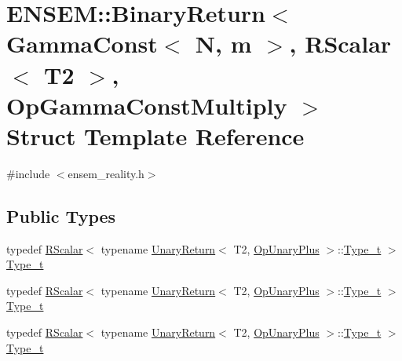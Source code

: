 \hypertarget{structENSEM_1_1BinaryReturn_3_01GammaConst_3_01N_00_01m_01_4_00_01RScalar_3_01T2_01_4_00_01OpGammaConstMultiply_01_4}{}\section{E\+N\+S\+EM\+:\+:Binary\+Return$<$ Gamma\+Const$<$ N, m $>$, R\+Scalar$<$ T2 $>$, Op\+Gamma\+Const\+Multiply $>$ Struct Template Reference}
\label{structENSEM_1_1BinaryReturn_3_01GammaConst_3_01N_00_01m_01_4_00_01RScalar_3_01T2_01_4_00_01OpGammaConstMultiply_01_4}


{\ttfamily \#include $<$ensem\+\_\+reality.\+h$>$}

\subsection*{Public Types}
\begin{DoxyCompactItemize}
\item 
typedef \mbox{\hyperlink{classENSEM_1_1RScalar}{R\+Scalar}}$<$ typename \mbox{\hyperlink{structENSEM_1_1UnaryReturn}{Unary\+Return}}$<$ T2, \mbox{\hyperlink{structENSEM_1_1OpUnaryPlus}{Op\+Unary\+Plus}} $>$\+::\mbox{\hyperlink{structENSEM_1_1BinaryReturn_3_01GammaConst_3_01N_00_01m_01_4_00_01RScalar_3_01T2_01_4_00_01OpGammaConstMultiply_01_4_a488943521f764ace274eff3fb2af9517}{Type\+\_\+t}} $>$ \mbox{\hyperlink{structENSEM_1_1BinaryReturn_3_01GammaConst_3_01N_00_01m_01_4_00_01RScalar_3_01T2_01_4_00_01OpGammaConstMultiply_01_4_a488943521f764ace274eff3fb2af9517}{Type\+\_\+t}}
\item 
typedef \mbox{\hyperlink{classENSEM_1_1RScalar}{R\+Scalar}}$<$ typename \mbox{\hyperlink{structENSEM_1_1UnaryReturn}{Unary\+Return}}$<$ T2, \mbox{\hyperlink{structENSEM_1_1OpUnaryPlus}{Op\+Unary\+Plus}} $>$\+::\mbox{\hyperlink{structENSEM_1_1BinaryReturn_3_01GammaConst_3_01N_00_01m_01_4_00_01RScalar_3_01T2_01_4_00_01OpGammaConstMultiply_01_4_a488943521f764ace274eff3fb2af9517}{Type\+\_\+t}} $>$ \mbox{\hyperlink{structENSEM_1_1BinaryReturn_3_01GammaConst_3_01N_00_01m_01_4_00_01RScalar_3_01T2_01_4_00_01OpGammaConstMultiply_01_4_a488943521f764ace274eff3fb2af9517}{Type\+\_\+t}}
\item 
typedef \mbox{\hyperlink{classENSEM_1_1RScalar}{R\+Scalar}}$<$ typename \mbox{\hyperlink{structENSEM_1_1UnaryReturn}{Unary\+Return}}$<$ T2, \mbox{\hyperlink{structENSEM_1_1OpUnaryPlus}{Op\+Unary\+Plus}} $>$\+::\mbox{\hyperlink{structENSEM_1_1BinaryReturn_3_01GammaConst_3_01N_00_01m_01_4_00_01RScalar_3_01T2_01_4_00_01OpGammaConstMultiply_01_4_a488943521f764ace274eff3fb2af9517}{Type\+\_\+t}} $>$ \mbox{\hyperlink{structENSEM_1_1BinaryReturn_3_01GammaConst_3_01N_00_01m_01_4_00_01RScalar_3_01T2_01_4_00_01OpGammaConstMultiply_01_4_a488943521f764ace274eff3fb2af9517}{Type\+\_\+t}}
\end{DoxyCompactItemize}


